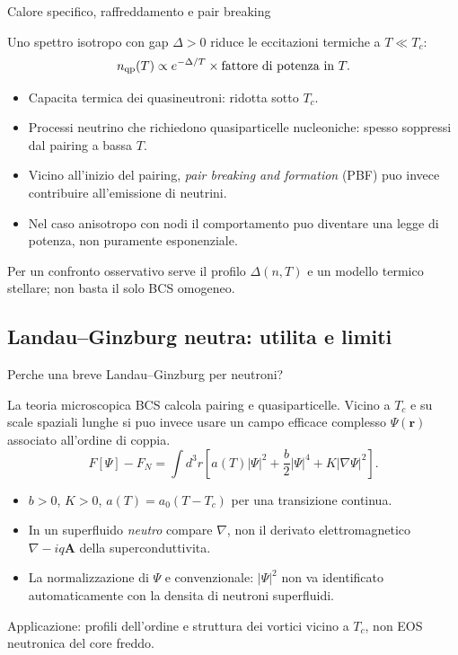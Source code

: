 \begin{frame}[t]{Calore specifico, raffreddamento e pair breaking}
\vspace*{3mm}
\small

Uno spettro isotropo con gap $\Delta>0$ riduce le eccitazioni termiche a $T\ll T_c$:
\[
n_{\rm qp}(T)\propto e^{-\Delta/T}\times
\text{fattore di potenza in }T.
\]
\begin{itemize}
\item Capacita termica dei quasineutroni: ridotta sotto $T_c$.
\item Processi neutrino che richiedono quasiparticelle nucleoniche: spesso soppressi dal pairing a bassa $T$.
\item Vicino all'inizio del pairing, \emph{pair breaking and formation} (PBF) puo invece contribuire all'emissione di neutrini.
\item Nel caso anisotropo con nodi il comportamento puo diventare una legge di potenza, non puramente esponenziale.
\end{itemize}
Per un confronto osservativo serve il profilo $\Delta(n,T)$ e un modello termico stellare; non basta il solo BCS omogeneo.
\end{frame}

\subsection{Landau--Ginzburg neutra: utilita e limiti}

\begin{frame}[t]{Perche una breve Landau--Ginzburg per neutroni?}
\vspace*{3mm}
\small

La teoria microscopica BCS calcola pairing e quasiparticelle. Vicino a $T_c$ e su scale spaziali lunghe si puo invece usare un campo efficace complesso $\Psi(\mathbf r)$ associato all'ordine di coppia.
\[
\boxed{F[\Psi]-F_N=\int d^3r\left[
 a(T)|\Psi|^2+\frac b2|\Psi|^4+K|\nabla\Psi|^2\right].}
\]
\begin{itemize}
\item $b>0$, $K>0$, $a(T)=a_0(T-T_c)$ per una transizione continua.
\item In un superfluido \emph{neutro} compare $\nabla$, non il derivato elettromagnetico $\nabla-iq\mathbf A$ della superconduttivita.
\item La normalizzazione di $\Psi$ e convenzionale: $|\Psi|^2$ non va identificato automaticamente con la densita di neutroni superfluidi.
\end{itemize}
Applicazione: profili dell'ordine e struttura dei vortici vicino a $T_c$, non EOS neutronica del core freddo.
\end{frame}

